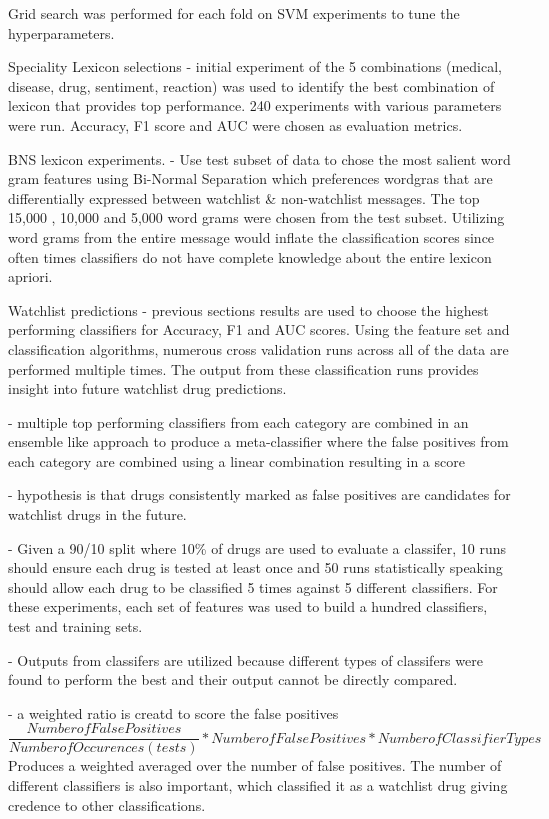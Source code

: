 \documentclass[twoside,11pt]{article}
\begin{document}
Grid search was performed for each fold on SVM experiments to tune the hyperparameters.

Speciality Lexicon selections
- initial experiment of the 5 combinations (medical, disease, drug, sentiment, reaction) was used to identify the best combination of lexicon that provides top performance. 240 experiments with various parameters were run.  Accuracy, F1 score and AUC were chosen as evaluation metrics.

BNS lexicon experiments.
- Use test subset of data to chose the most salient word gram features using Bi-Normal Separation which preferences wordgras that are differentially expressed between watchlist & non-watchlist messages.  The top 15,000 , 10,000 and 5,000 word grams were chosen from the test subset. Utilizing word grams from the entire message would inflate the classification scores since often times classifiers do not have complete knowledge about the entire lexicon apriori.

Watchlist predictions
- previous sections results are used to choose the highest performing classifiers for Accuracy, F1 and AUC scores. Using the feature set and classification algorithms, numerous cross validation runs across all of the data are performed multiple times.  The output from these classification runs provides insight into future watchlist drug predictions.

- multiple top performing classifiers from each category are combined in an ensemble like approach to produce a meta-classifier where the false positives from each category are combined using a linear combination resulting in a score

- hypothesis is that drugs consistently marked as false positives are candidates for watchlist drugs in the future.


- Given a 90/10 split where 10\% of drugs are used to evaluate a classifer, 10 runs should ensure each drug is tested at least once and 50 runs statistically speaking should allow each drug to be classified 5 times against 5 different classifiers.  For these experiments, each set of features was used to build a hundred classifiers, test and training sets.


- Outputs from classifers are utilized because different types of classifers were found to perform the best and their output cannot be directly compared.


- a weighted ratio is creatd to score the false positives
\[
  \frac{Number of False Positives}{Number of Occurences(tests)} * Number of False Positives * Number of Classifier Types
\]
Produces a weighted averaged over the number of false positives.  The number of different classifiers is also important, which classified it as a watchlist drug giving credence to other classifications.
\end{document}
